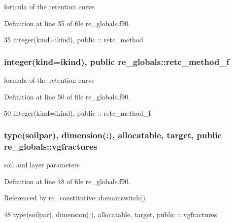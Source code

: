 formula of the retention curve 



Definition at line 35 of file re\+\_\+globals.\+f90.


\begin{DoxyCode}
35   \textcolor{keywordtype}{integer(kind=ikind)}, \textcolor{keywordtype}{public} :: retc_method
\end{DoxyCode}
\subsubsection[{retc\+\_\+method\+\_\+f}]{\setlength{\rightskip}{0pt plus 5cm}integer(kind=ikind), public re\+\_\+globals\+::retc\+\_\+method\+\_\+f}\label{namespacere__globals_adf6e9e681d9d10303a07fd39ad02d5bd}


formula of the retention curve 



Definition at line 50 of file re\+\_\+globals.\+f90.


\begin{DoxyCode}
50   \textcolor{keywordtype}{integer(kind=ikind)}, \textcolor{keywordtype}{public} :: retc_method_f
\end{DoxyCode}
\subsubsection[{vgfractures}]{\setlength{\rightskip}{0pt plus 5cm}type({\bf soilpar}), dimension(\+:), allocatable, target, public re\+\_\+globals\+::vgfractures}\label{namespacere__globals_ad6f10c7933dfd444cdff9577510ed21b}


soil and layer parameters 



Definition at line 48 of file re\+\_\+globals.\+f90.



Referenced by re\+\_\+constitutive\+::domainswitch().


\begin{DoxyCode}
48   \textcolor{keywordtype}{type}(soilpar), \textcolor{keywordtype}{dimension(:)}, \textcolor{keywordtype}{allocatable}, \textcolor{keywordtype}{target}, \textcolor{keywordtype}{public} :: vgfractures
\end{DoxyCode}
